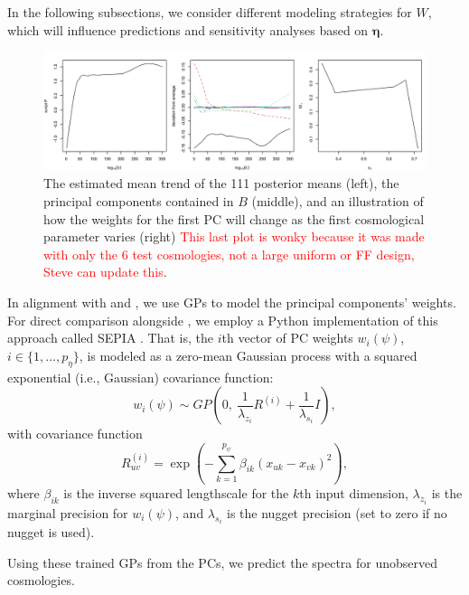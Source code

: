\documentclass[11pt]{article}
\begin{document}
In the following subsections, we consider different modeling strategies for $W$, 
which will influence predictions and sensitivity analyses based on $\boldsymbol\eta$.

\begin{figure}
    \centering
    \includegraphics[width=\textwidth]{mean_PCs_oneW.png}
    \caption{The estimated mean trend of the 111 posterior means (left), the principal 
    components contained in $B$ (middle), and an illustration of how the weights 
    for the first PC will change as the first cosmological parameter varies (right) 
    \textcolor{red}{This last plot is wonky because it was made with only the 6 test 
    cosmologies, not a large uniform or FF design, Steve can update this}.}
    \label{fig:mean_PCs_oneW}
\end{figure}



In alignment with \cite{heitmann2009coyote} and \cite{higdon2010estcosmo}, we use 
GPs to model the principal components' weights. For direct comparison alongside
\cite{moran2023mira}, we employ a Python implementation of this approach called 
SEPIA \citep{gattiker2020sepia}. That is, the $i$th vector of PC weights $w_i(\psi)$, 
$i \in \{1,\ldots,p_\eta\}$, is modeled as a zero-mean Gaussian process with a 
squared exponential (i.e., Gaussian) covariance function:
\[
w_i(\psi) \sim GP\left(0,\ \frac{1}{\lambda_{z_i}} R^{(i)} + \frac{1}{\lambda_{s_i}} I \right),
\]
with covariance function
\[
R^{(i)}_{uv} = \exp\left(-\sum_{k=1}^{p_\psi} \beta_{ik} (x_{uk} - x_{vk})^2 \right),
\]
where $\beta_{ik}$ is the inverse squared lengthscale for the $k$th input dimension, $\lambda_{z_i}$ is the marginal precision for $w_i(\psi)$, and $\lambda_{s_i}$ is the nugget precision (set to zero if no nugget is used).

Using these trained GPs from the PCs, we predict the spectra for unobserved cosmologies.
\end{document}

